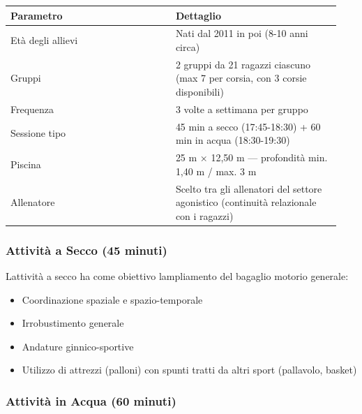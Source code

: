 \documentclass[a4paper,11pt]{article}
\providecommand{\tightlist}{%
  \setlength{\itemsep}{0pt}\setlength{\parskip}{0pt}}
\begin{document}
\begin{longtable}[]{@{}p{0.47\linewidth}p{0.47\linewidth}@{}}
      \toprule\noalign{}
      Parametro         & Dettaglio                                                       \\
      \midrule\noalign{}
      \endhead
      \bottomrule\noalign{}
      \endlastfoot
      Età degli allievi & Nati dal 2011 in poi (8-10 anni circa)                          \\
      Gruppi            & 2 gruppi da 21 ragazzi ciascuno (max 7 per corsia, con 3 corsie
      disponibili)                                                                        \\
      Frequenza         & 3 volte a settimana per gruppo                                  \\
      Sessione tipo     & 45 min a secco (17:45-18:30) + 60 min in acqua
      (18:30-19:30)                                                                       \\
      Piscina           & 25 m × 12,50 m --- profondità min. 1,40 m / max. 3 m            \\
      Allenatore        & Scelto tra gli allenatori del settore agonistico
      (continuità relazionale con i ragazzi)                                              \\
\end{longtable}

\subsubsection{Attività a Secco (45
      minuti)}\label{attivituxe0-a-secco-45-minuti}

L\textquotesingle attività a secco ha come obiettivo
l\textquotesingle ampliamento del bagaglio motorio generale:

\begin{itemize}
      \tightlist
      \item
            Coordinazione spaziale e spazio-temporale
      \item
            Irrobustimento generale
      \item
            Andature ginnico-sportive
      \item
            Utilizzo di attrezzi (palloni) con spunti tratti da altri sport
            (pallavolo, basket)
\end{itemize}

\subsubsection{Attività in Acqua (60
      minuti)}\label{attivituxe0-in-acqua-60-minuti}
\end{document}
